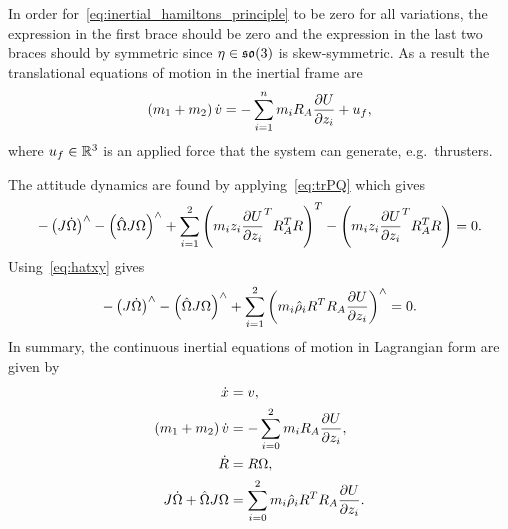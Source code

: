 In order for~\cref{eq:inertial_hamiltons_principle} to be zero for all variations, the expression in the first brace should be zero and the expression in the last two braces should by symmetric since \( \eta \in \mathfrak{so}(3) \) is skew-symmetric.
As a result the translational equations of motion in the inertial frame are
\begin{align*}
    \left( m_1 + m_2 \right) \dot{v} = - \sum_{i=1}^n m_i R_A \frac{\partial U}{\partial z_i} + u_f,
\end{align*}
where \( u_f \in \mathbb{R}^3 \) is an applied force that the system can generate, e.g.\ thrusters.

The attitude dynamics are found by applying~\cref{eq:trPQ} which gives
\begin{align}
    -\left( J \dot{\Omega} \right)^\wedge - \left(  \hat{\Omega} J \Omega \right)^\wedge + \sum_{i=1}^{2} \left( m_i z_i \frac{\partial U}{\partial z_i}^T R_A^T R  \right)^T - \left( m_i z_i \frac{\partial U}{\partial z_i}^T R_A^T R   \right) = 0.
\end{align}
Using~\cref{eq:hatxy} gives
\begin{align}
    -\left( J \dot{\Omega} \right)^\wedge - \left(  \hat{\Omega} J \Omega \right)^\wedge + \sum_{i=1}^2 \left( m_i \hat{\rho}_i R^T R_A \frac{\partial U}{\partial z_i} \right)^\wedge  = 0.
\end{align}
In summary, the continuous inertial equations of motion in Lagrangian form are given by
\begin{align}
    \dot{x} &= v, \\
    \left( m_1 + m_2 \right) \dot{v} &= - \sum_{i=0}^2 m_i R_A \frac{\partial U}{\partial z_i}, \\
    \dot{R} &= R \Omega, \\
    J \dot{\Omega} + \hat{\Omega} J \Omega &= \sum_{i=0}^2 m_i \hat{\rho}_i R^T R_A \frac{\partial U}{\partial z_i} .
\end{align}

